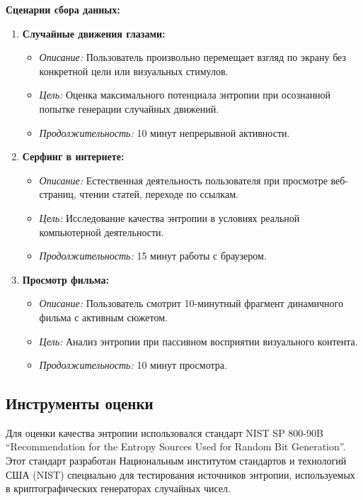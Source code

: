 \documentclass[14pt, a4paper]{extreport}
\begin{document}
\textbf{Сценарии сбора данных:}
\begin{enumerate}
    \item \textbf{Случайные движения глазами:}
    \begin{itemize}
        \item \textit{Описание:} Пользователь произвольно перемещает взгляд по экрану без конкретной цели или визуальных стимулов.
        \item \textit{Цель:} Оценка максимального потенциала энтропии при осознанной попытке генерации случайных движений.
        \item \textit{Продолжительность:} 10 минут непрерывной активности.
    \end{itemize}
    
    \item \textbf{Серфинг в интернете:}
    \begin{itemize}
        \item \textit{Описание:} Естественная деятельность пользователя при просмотре веб-страниц, чтении статей, переходе по ссылкам.
        \item \textit{Цель:} Исследование качества энтропии в условиях реальной компьютерной деятельности.
        \item \textit{Продолжительность:} 15 минут работы с браузером.
    \end{itemize}
    
    \item \textbf{Просмотр фильма:}
    \begin{itemize}
        \item \textit{Описание:} Пользователь смотрит 10-минутный фрагмент динамичного фильма с активным сюжетом.
        \item \textit{Цель:} Анализ энтропии при пассивном восприятии визуального контента.
        \item \textit{Продолжительность:} 10 минут просмотра.
    \end{itemize}
\end{enumerate}

\subsection{Инструменты оценки}

Для оценки качества энтропии использовался стандарт NIST SP 800-90B ``Recommendation for the Entropy Sources Used for Random Bit Generation''. Этот стандарт разработан Национальным институтом стандартов и технологий США (NIST) специально для тестирования источников энтропии, используемых в криптографических генераторах случайных чисел.
\end{document}
